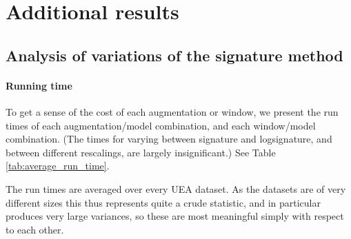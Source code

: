 \documentclass{article}
\theoremstyle{definition}
\theoremstyle{remark}
\begin{document}
     	\section{Additional results}
	\label{sec:additional_results}

	\subsection{Analysis of variations of the signature method}
	\paragraph{Running time}
	To get a sense of the cost of each augmentation or window, we present the run times of each augmentation/model combination, and each window/model combination. (The times for varying between signature and logsignature, and between different rescalings, are largely insignificant.) See Table \ref{tab:average_run_time}.
	
	The run times are averaged over every UEA dataset. As the datasets are of very different sizes this thus represents quite a crude statistic, and in particular produces very large variances, so these are most meaningful simply with respect to each other.
	
\end{document}
